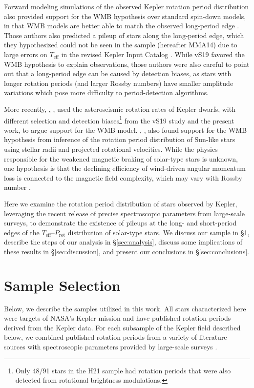 \documentclass[trackchanges,twocolumn]{aastex631}
\newcommand{\jvs}{vS19\xspace}
\newcommand{\mma}{MMA14\xspace}
\newcommand{\hall}{H21\xspace}
\newcommand{\teff}{\ensuremath{T_{\mathrm{eff}}}\xspace}
\newcommand{\prot}{\ensuremath{P_\mathrm{rot}}\xspace}
\begin{document}
Forward modeling simulations of the observed Kepler rotation period distribution also provided support for the WMB hypothesis over standard spin-down models, in that WMB models are better able to match the observed long-period edge \citep[][hereafter vS19]{vanSaders2019}. Those authors also predicted a pileup of stars along the long-period edge, which they hypothesized could not be seen in the \citet{McQuillan2014} sample (hereafter \mma) due to large errors on \teff in the revised Kepler Input Catalog \citep[KIC,][]{Huber2014}. While \jvs favored the WMB hypothesis to explain observations, those authors were also careful to point out that a long-period edge can be caused by detection biases, as stars with longer rotation periods (and larger Rossby numbers) have smaller amplitude variations which pose more difficulty to period-detection algorithms. 

More recently, \citet{Hall2021}, , used the asteroseismic rotation rates of Kepler dwarfs, with different selection and detection biases\footnote{Only 48/91 stars in the \hall sample had rotation periods that were also detected from rotational brightness modulations.} from the \jvs study and the present work, to argue support for the WMB model. \citet{Masuda2021}, , also found support for the WMB hypothesis from inference of the rotation period distribution of Sun-like stars using stellar radii and projected rotational velocities.  While the physics responsible for the weakened magnetic braking of solar-type stars is unknown, one hypothesis is that the declining efficiency of wind-driven angular momentum loss is connected to the magnetic field complexity, which may vary with Rossby number \citep[e.g.][]{Reville2015, vanSaders2016, Garraffo2016, Metcalfe2016, Metcalfe2019}.  

Here we examine the rotation period distribution of stars observed by Kepler, leveraging the recent release of precise spectroscopic parameters from large-scale surveys, to demonstrate the existence of pileups at the long- and short-period edges of the \teff--\prot distribution of solar-type stars. We discuss our sample in \S\ref{sec:sample}, describe the steps of our analysis in \S\ref{sec:analysis}, discuss some implications of these results in \S\ref{sec:discussion}, and present our conclusions in \S\ref{sec:conclusions}.

\section{Sample Selection} \label{sec:sample}
Below, we describe the samples utilized in this work. All stars characterized here were targets of NASA's Kepler mission \citep{Borucki2010} and have published rotation periods derived from the Kepler data. For each subsample of the Kepler field described below, we combined published rotation periods from a variety of literature sources with spectroscopic parameters provided by large-scale surveys .
\end{document}
